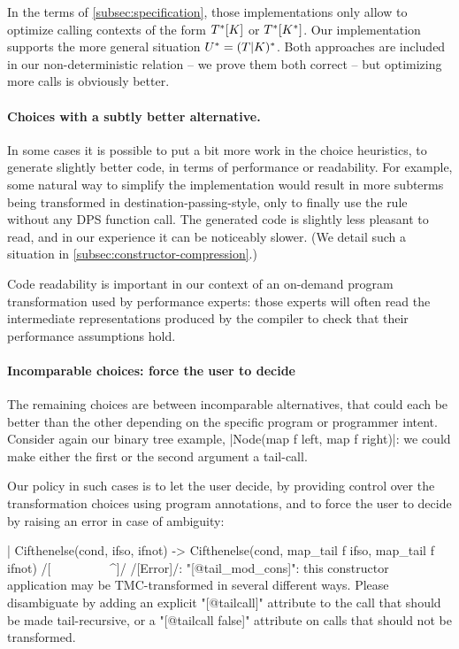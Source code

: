 In the terms of \cref{subsec:specification}, those implementations only allow to optimize calling contexts of the form $\datalangTailCtx{[\datalangConsFrame]}$ or $\datalangTailCtx{[\datalangConsCtx]}$. Our implementation supports the more general situation $\datalangTMCCtx = (\datalangTailFrame | \datalangConsFrame)^{*}$. Both approaches are included in our non-deterministic relation -- we prove them both correct -- but optimizing more calls is obviously better.

\paragraph{Choices with a subtly better alternative.} In some cases it
is possible to put a bit more work in the choice heuristics, to
generate slightly better code, in terms of performance or
readability. For example, some natural way to simplify the
implementation would result in more subterms being transformed in
destination-passing-style, only to finally use the
 rule without any DPS function call. The generated
code is slightly less pleasant to read, and in our experience it can
be noticeably slower. (We detail such a situation in \cref{subsec:constructor-compression}.)

Code readability is important in our context of an on-demand program
transformation used by performance experts: those experts will often
read the intermediate representations produced by the compiler to
check that their performance assumptions hold.

\paragraph{Incomparable choices: force the user to decide} The
remaining choices are between incomparable alternatives, that could
each be better than the other depending on the specific program or
programmer intent. Consider again our binary tree example,
\ocaml|Node(map f left, map f right)|: we could make either the first
or the second argument a tail-call.

Our policy in such cases is to let the user decide, by providing
control over the transformation choices using \ocaml{[@tailcall]}
program annotations, and to force the user to decide by raising an
error in case of ambiguity:
\begin{Ocaml}
  | Cifthenelse(cond, ifso, ifnot) ->
      Cifthenelse(cond, map_tail f ifso, map_tail f ifnot)
      /[^^^^^^^^^^^^^^^^^^^^^^^^^^^^^^^^^^^^^^^^^^^^^^^^^^^^]/
/[Error]/: "[@tail_mod_cons]": this constructor application may be TMC-transformed
       in several different ways. Please disambiguate by adding an explicit
       "[@tailcall]" attribute to the call that should be made tail-recursive,
       or a "[@tailcall false]" attribute on calls that should not be
       transformed.
\end{Ocaml}

